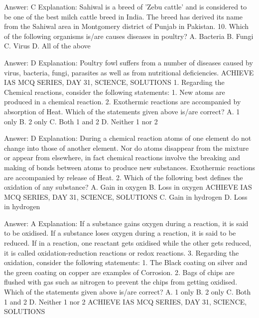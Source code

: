 Answer: C
Explanation: Sahiwal is a breed of 'Zebu cattle' and is considered to be one of the best milch cattle breed in India. The breed has derived its name from the Sahiwal area in Montgomery district of Punjab in Pakistan. 10. Which of the following organisms is/are causes diseases in poultry? A. Bacteria B. Fungi C. Virus D. All of the above 

Answer: D
Explanation: Poultry fowl suffers from a number of diseases caused by virus, bacteria, fungi, parasites as well as from nutritional deficiencies. ACHIEVE IAS MCQ SERIES, DAY 31, SCIENCE, SOLUTIONS 1. Regarding the Chemical reactions, consider the following statements: 1. New atoms are produced in a chemical reaction. 2. Exothermic reactions are accompanied by absorption of Heat. Which of the statements given above is/are correct? A. 1 only B. 2 only C. Both 1 and 2 D. Neither 1 nor 2 

Answer: D
Explanation: During a chemical reaction atoms of one element do not change into those of another element. Nor do atoms disappear from the mixture or appear from elsewhere, in fact chemical reactions involve the breaking and making of bonds between atoms to produce new substances. Exothermic reactions are accompanied by release of Heat. 2. Which of the following best defines the oxidation of any substance? A. Gain in oxygen B. Loss in oxygen ACHIEVE IAS MCQ SERIES, DAY 31, SCIENCE, SOLUTIONS C. Gain in hydrogen D. Loss in hydrogen 

Answer: A
Explanation: If a substance gains oxygen during a reaction, it is said to be oxidised. If a substance loses oxygen during a reaction, it is said to be reduced. If in a reaction, one reactant gets oxidised while the other gets reduced, it is called oxidation-reduction reactions or redox reactions. 3. Regarding the oxidation, consider the following statements: 1. The Black coating on silver and the green coating on copper are examples of Corrosion. 2. Bags of chips are flushed with gas such as nitrogen to prevent the chips from getting oxidised. Which of the statements given above is/are correct? A. 1 only B. 2 only C. Both 1 and 2 D. Neither 1 nor 2 ACHIEVE IAS MCQ SERIES, DAY 31, SCIENCE, SOLUTIONS 

